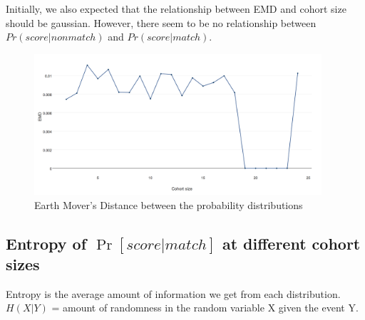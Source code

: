 Initially, we also expected that the relationship between EMD and cohort size
should be gaussian. However, there seem to be no relationship between
$Pr(score|nonmatch)$ and $Pr(score|match)$.

\begin{figure}[h]
  \centering
  \includegraphics[width=0.95\textwidth]{dataset/otago/emd}
  \caption{Earth Mover's Distance between the probability distributions}
  \label{fig:emd_grand}
\end{figure}

\subsection{Entropy of $\Pr{[score|match]}$ at different cohort sizes}

Entropy is the average amount of information we get from each distribution.
$H(X|Y)$ = amount of randomness in the random variable X given the event Y.

